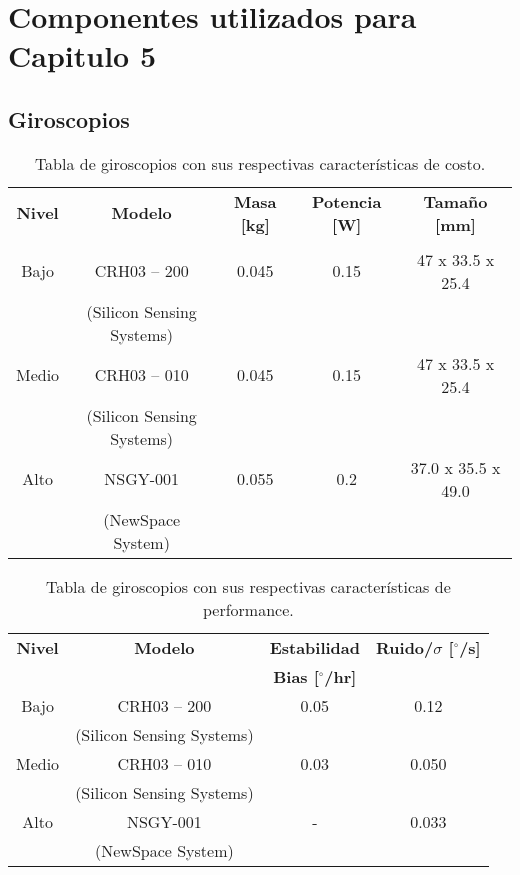 \section{Componentes utilizados para Capitulo 5}

\label{ap:Z7}

\subsection{Giroscopios}

\begin{table}[h!]
	\centering
	\caption{Tabla de giroscopios con sus respectivas características de costo.}
	\begin{tabular}{|c|c|c|c|c|}
		\hline
		\textbf{Nivel} & \textbf{Modelo} & \textbf{Masa [kg]} & \textbf{Potencia [W]} & \textbf{Tamaño [mm]}  \\
		& &  &  &   \\ \hline
		Bajo & CRH03 -- 200 \cite{ref47} & 0.045 & 0.15 & 47 x 33.5 x 25.4 \\
		& (Silicon Sensing Systems) &  &  &  \\ \hline
		Medio & CRH03 -- 010 \cite{ref48} & 0.045 & 0.15 & 47 x 33.5 x 25.4  \\
		& (Silicon Sensing Systems) & &  &  \\ \hline
		Alto & NSGY-001 \cite{ref49} & 0.055 & 0.2 & 37.0 x 35.5 x 49.0  \\
		 & (NewSpace System) & &  &   \\ \hline
	\end{tabular}

\end{table}

\begin{table}[h!]
	\centering
	\caption{Tabla de giroscopios con sus respectivas características de performance.}
	\begin{tabular}{|c|c|c|c|}
		\hline
		\textbf{Nivel} & \textbf{Modelo}  & \textbf{Estabilidad} & \textbf{Ruido/$\sigma$ [$^\circ$/s]} \\
		& & \textbf{Bias [$^\circ$/hr]} &  \\ \hline
		Bajo & CRH03 -- 200 & 0.05 & 0.12 \\
		& (Silicon Sensing Systems) &  &   \\ \hline
		Medio & CRH03 -- 010 &  0.03 & 0.050 \\
		& (Silicon Sensing Systems)  &  & \\ \hline
		Alto & NSGY-001 & - & 0.033 \\
		& (NewSpace System) & &   \\ \hline
	\end{tabular}
	
\end{table}

